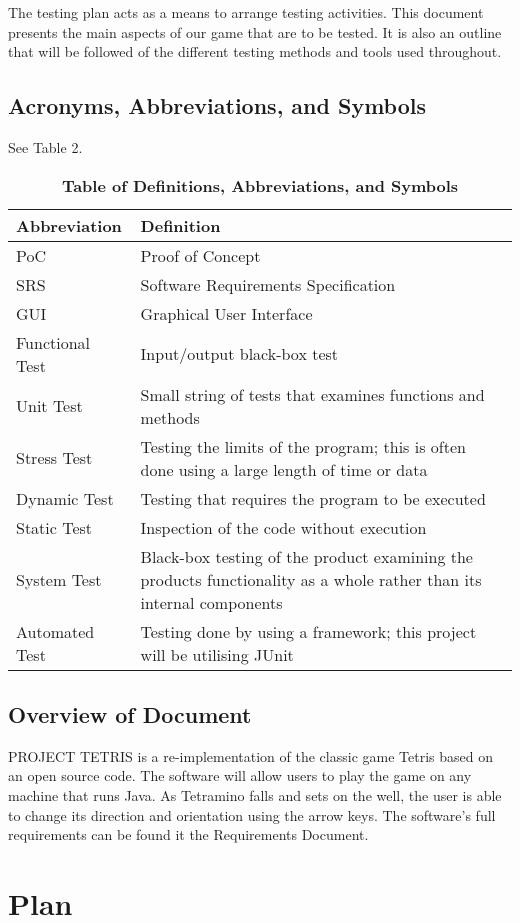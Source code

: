 \documentclass[12pt, titlepage]{article}
\begin{document}
The testing plan acts as a means to arrange testing activities. This document presents the main aspects of our game that are to be tested. It is also an outline that will be followed of the different testing methods and tools used throughout.
\subsection{Acronyms, Abbreviations, and Symbols}
See Table 2.
\begin{table}[!h]
\caption{\textbf{Table of Definitions, Abbreviations, and Symbols}} \label{Table}
\begin{tabularx}{\textwidth}{p{3cm}X}
\toprule
\textbf{Abbreviation} & \textbf{Definition} \\
\midrule
PoC & Proof of Concept\\
SRS & Software Requirements Specification\\
GUI & Graphical User Interface\\
Functional Test & Input/output black-box test\\
Unit Test & Small string of tests that examines functions and methods\\
Stress Test & Testing the limits of the program; this is often done using a large length of time or data\\
Dynamic Test & Testing that requires the program to be executed\\
Static Test & Inspection of the code without execution\\
System Test & Black-box testing of the product examining the products functionality as a whole rather than its internal components\\
Automated Test & Testing done by using a framework; this project will be utilising JUnit \\
\bottomrule
\end{tabularx}
\end{table}
\subsection{Overview of Document}
PROJECT TETRIS is a re-implementation of the classic game Tetris based on an open source code. The software will allow users to play the game on any machine that runs Java. As Tetramino falls and sets on the well, the user is able to change its direction and orientation using the arrow keys. The software's full requirements can be found it the Requirements Document.
\section{Plan}
	
\end{document}
